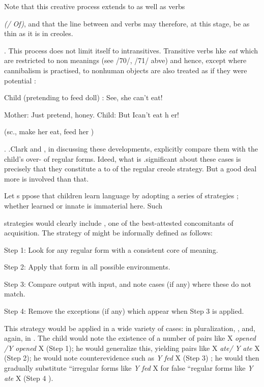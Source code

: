 Note that this creative process extends to  as well as verbs

\textit{(/} \textit{Of}\textit{)}, and that the line between  and verbs may therefore, at this stage, be as thin as it is in creoles.

. This process does not limit itself to intransitives. Transitive verbs hke \textit{eat} which are restricted to non meanings (see /70/, /71/ abve) and hence, except where cannibalism is practised, to nonhuman objects are also treated as if they were potential :

\ea\label{ex:81}
 Child (pretending to feed doll) : See, she can't eat!
\glt
\z

Mother: Just pretend, honey. Child: But Ican't eat h er!

(sc., make her eat, feed her )

. .Clark and \citet[511]{Clark1977}, in discussing these developments, explicitly compare them with the child's over- of regular  forms. Ideed, what is .significant about these cases is precisely that they constitute a  to  of the regular creole strategy. But a good deal more is involved than that.

 Let s ppose that children learn language by adopting a series of strategies ; whether learned or innate is immaterial here. Such


strategies would clearly include , one of the best-attested concomitants of acquisition. The strategy of  might be informally defined as follows:

Step 1: Look for any regular form with a consistent core of meaning.

Step 2: Apply that form in all possible environments.

Step 3: Compare output with input, and note cases (if any) where these do not match.

Step 4: Remove the exceptions (if any) which appear when Step 3 is applied.

This strategy would be applied in a wide variety of cases: in  pluralization, , and, again, in . The child would note the existence of a number of pairs like X \textit{o}\textit{pened} \textit{/Y} \textit{opened} X (Step 1); he would generalize this, yielding pairs like X \textit{ate}\textit{/} \textit{Y} \textit{ate} X (Step 2); he would note counterevidence such as \textit{Y} \textit{fed }X (Step 3) ; he would then gradually substitute ``irregular forms like \textit{Y fed }X for false ``regular forms like \textit{Y} \textit{ate} X (Step 4 ).

